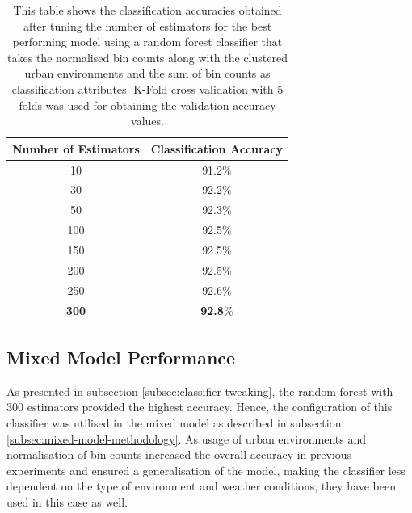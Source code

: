 \documentclass[bsc,frontabs,twoside,singlespacing,parskip,deptreport]{infthesis}     %
\begin{document}
\begin{table}[h!]
\centering
 \begin{tabular}{|| c | c ||} 
 \hline
 Number of Estimators & Classification Accuracy \\ [0.5ex] 
 \hline\hline
 10 & 91.2\% \\ 
 \hline
 30 & 92.2\% \\ 
 \hline
 50 & 92.3\% \\ 
 \hline
 100 & 92.5\% \\ 
 \hline
 150 & 92.5\% \\
 \hline
  200 & 92.5\% \\ 
 \hline
   250 & 92.6\% \\ 
 \hline
 \textbf{300} & \textbf{92.8}\% \\ 
 \hline
\end{tabular}
\caption{This table shows the classification accuracies obtained after tuning the number of estimators for the best performing model using a random forest classifier that takes the normalised bin counts along with the clustered urban environments and the sum of bin counts as classification attributes. K-Fold cross validation with 5 folds was used for obtaining the validation accuracy values.}
\label{table:n-estimators}
\end{table}


\subsection{Mixed Model Performance}

As presented in subsection \ref{subsec:classifier-tweaking}, the random forest with 300 estimators provided the highest accuracy. Hence, the configuration of this classifier was utilised in the mixed model as described in subsection \ref{subsec:mixed-model-methodology}. As usage of urban environments and normalisation of bin counts increased the overall accuracy in previous experiments and ensured a generalisation of the model, making the classifier less dependent on the type of environment and weather conditions, they have been used in this case as well. 
\end{document}
